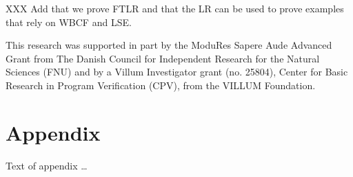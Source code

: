 \documentclass[sigplan,review]{acmart}\settopmatter{printfolios=true,printccs=false,printacmref=false}
\begin{document}



XXX Add that we prove FTLR and that the LR can be used to prove examples that rely
on WBCF and LSE.

\begin{acks}                            %

  This research was supported in part by the ModuRes Sapere Aude Advanced Grant from The Danish Council for Independent Research for the Natural Sciences (FNU) and by a Villum Investigator grant (no.
  25804), Center for Basic Research in Program Verification (CPV), from the VILLUM Foundation.
  
\end{acks}





\appendix
\section{Appendix}

Text of appendix \ldots
\end{document}
